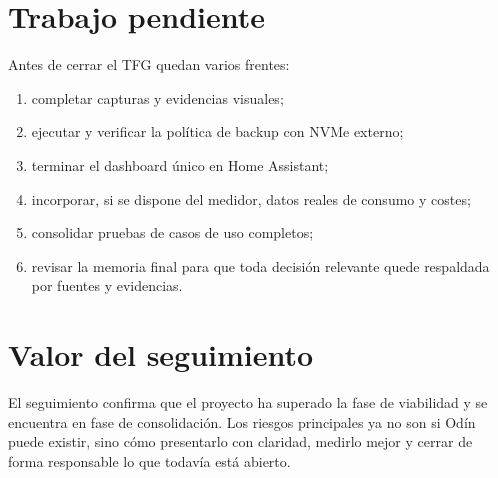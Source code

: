 \section{Trabajo pendiente}
Antes de cerrar el TFG quedan varios frentes:
\begin{enumerate}
  \item completar capturas y evidencias visuales;
  \item ejecutar y verificar la política de backup con NVMe externo;
  \item terminar el dashboard único en Home Assistant;
  \item incorporar, si se dispone del medidor, datos reales de consumo y costes;
  \item consolidar pruebas de casos de uso completos;
  \item revisar la memoria final para que toda decisión relevante quede respaldada por fuentes y evidencias.
\end{enumerate}

\section{Valor del seguimiento}
El seguimiento confirma que el proyecto ha superado la fase de viabilidad y se encuentra en fase de consolidación. Los riesgos principales ya no son si Odín puede existir, sino cómo presentarlo con claridad, medirlo mejor y cerrar de forma responsable lo que todavía está abierto.
